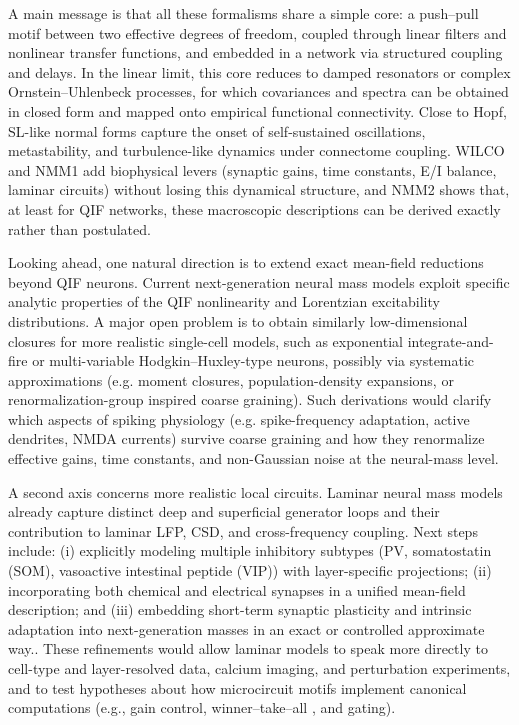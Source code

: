 \documentclass[12pt]{article}
\numberwithin{equation}{section}
\begin{document}
A main message is that all these formalisms share a simple core: a push–pull motif between two effective degrees of freedom, coupled through linear filters and nonlinear transfer functions, and embedded in a network via structured coupling and delays. In the linear limit, this core reduces to damped resonators or complex Ornstein–Uhlenbeck processes, for which covariances and spectra can be obtained in closed form and mapped onto empirical functional connectivity.\cite{ponce-alvarezHopfWholebrainModel2024,Nozari2024} Close to Hopf, SL-like normal forms capture the onset of self-sustained oscillations, metastability, and turbulence-like dynamics under connectome coupling.\cite{decoTurbulentlikeDynamicsHuman2020,cabralMetastableOscillatoryModes2022,Escrichs2022Turbulence} WILCO and NMM1 add biophysical levers (synaptic gains, time constants, E/I balance, laminar circuits) without losing this dynamical structure, and NMM2 shows that, at least for QIF networks, these macroscopic descriptions can be derived exactly rather than postulated.

Looking ahead, one natural direction is to extend exact mean-field reductions beyond QIF neurons. Current next-generation neural mass models exploit specific analytic properties of the QIF nonlinearity and Lorentzian excitability distributions.\cite{montbrioMacroscopicDescriptionNetworks2015,coombesNextGenerationNeural2019} A major open problem is to obtain similarly low-dimensional closures for more realistic single-cell models, such as exponential integrate-and-fire or multi-variable Hodgkin–Huxley-type neurons, possibly via systematic approximations (e.g. moment closures, population-density expansions, or renormalization-group inspired coarse graining).\cite{nykampPopulationDensityApproach2000,buiceSystematicFluctuationExpansion2010,Goldobin2021} Such derivations would clarify which aspects of spiking physiology (e.g. spike-frequency adaptation, active dendrites, NMDA currents) survive coarse graining and how they renormalize effective gains, time constants, and non-Gaussian noise at the neural-mass level.

A second axis concerns more realistic local circuits. Laminar neural mass models already capture distinct deep and superficial generator loops and their contribution to laminar LFP, CSD, and cross-frequency coupling.\cite{sanchez-todoPhysicalNeuralMass2023,Ruffini2020P118} Next steps include: (i) explicitly modeling multiple inhibitory subtypes (PV, somatostatin (SOM), vasoactive intestinal peptide (VIP)) with layer-specific projections; (ii) incorporating both chemical and electrical synapses in a unified mean-field description; and (iii) embedding short-term synaptic plasticity and intrinsic adaptation into next-generation masses in an exact or controlled approximate way.\cite{Devalle:2017aa,taherExactNeuralMass2020,chenExactMeanfieldModels2022}. These refinements would allow laminar models to speak more directly to cell-type and layer-resolved data, calcium imaging, and perturbation experiments, and to test hypotheses about how microcircuit motifs implement canonical computations (e.g., gain control, winner–take–all , and gating).
\end{document}
